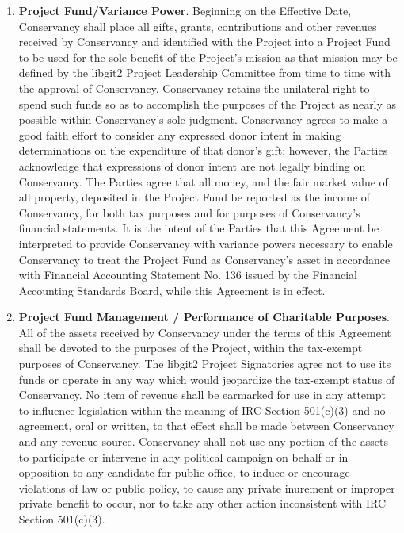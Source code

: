 \documentclass[letterpaper,12pt]{article}
\newcommand{\signatories}{libgit2 Project Signatories\xspace}
\newcommand{\leadershipbody}{libgit2 Project Leadership Committee\xspace}
\begin{document}
\begin{enumerate}[label=\arabic*.,ref=\S~\arabic*]
Notwithstanding the above, the \signatories agree that should Conservancy
be required to pay any taxes (including but not limited to sales taxes
and unrelated business taxable income) as the result of any activity
of the Project and/or activities undertaken by Conservancy on the
Project's behalf, such taxes shall be deducted from the Project Fund.


Conservancy will monitor any unrelated business taxable income and
may require the Project to cease activities generating such income
if the overall amounts exceed amounts permissible or prudent for Conservancy,
given Conservancy's tax exempt status.

\item \textbf{Project Fund/Variance Power}. Beginning on the Effective Date,
Conservancy shall place all gifts, grants, contributions and other
revenues received by Conservancy and identified with the Project into
a Project Fund to be used for the sole benefit of the Project's mission
as that mission may be defined by the \leadershipbody from
time to time with the approval of Conservancy. Conservancy retains
the unilateral right to spend such funds so as to accomplish the purposes
of the Project as nearly as possible within Conservancy's sole judgment.
Conservancy agrees to make a good faith effort to consider any expressed
donor intent in making determinations on the expenditure of that donor's
gift; however, the Parties acknowledge that expressions of donor intent
are not legally binding on Conservancy. The Parties agree that all
money, and the fair market value of all property, deposited in the
Project Fund be reported as the income of Conservancy, for both tax
purposes and for purposes of Conservancy's financial statements. It
is the intent of the Parties that this Agreement be interpreted to
provide Conservancy with variance powers necessary to enable Conservancy
to treat the Project Fund as Conservancy's asset in accordance with
Financial Accounting Statement No. 136 issued by the Financial Accounting
Standards Board, while this Agreement is in effect. 
\item \textbf{Project Fund Management / Performance of Charitable Purposes}.
\label{CharitablePurpose} All of the assets received by Conservancy
under the terms of this Agreement shall be devoted to the purposes
of the Project, within the tax-exempt purposes of Conservancy. The
\signatories agree not to use its funds or operate in any way which would
jeopardize the tax-exempt status of Conservancy. No item of revenue
shall be earmarked for use in any attempt to influence legislation
within the meaning of IRC Section 501(c)(3) and no agreement, oral
or written, to that effect shall be made between Conservancy and any
revenue source. Conservancy shall not use any portion of the assets
to participate or intervene in any political campaign on behalf or
in opposition to any candidate for public office, to induce or encourage
violations of law or public policy, to cause any private inurement
or improper private benefit to occur, nor to take any other action
inconsistent with IRC Section 501(c)(3). 


\end{enumerate}
\end{document}
